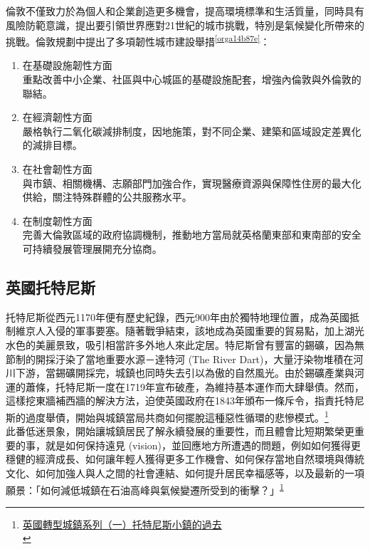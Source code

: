 \documentclass[a4paper,12pt]{article}
\begin{document}
倫敦不僅致力於為個人和企業創造更多機會，提高環境標準和生活質量，同時具有風險防範意識，提出要引領世界應對21世紀的城市挑戰，特別是氣候變化所帶來的挑戰。倫敦規劃中提出了多項韌性城市建設舉措\textsuperscript{\ref{orga14b87e}}：\\
\begin{enumerate}
\item 在基礎設施韌性方面\\
重點改善中小企業、社區與中心城區的基礎設施配套，增強內倫敦與外倫敦的聯結。\\
\item 在經濟韌性方面\\
嚴格執行二氧化碳減排制度，因地施策，對不同企業、建築和區域設定差異化的減排目標。\\
\item 在社會韌性方面\\
與市鎮、相關機構、志願部門加強合作，實現醫療資源與保障性住房的最大化供給，關注特殊群體的公共服務水平。\\
\item 在制度韌性方面\\
完善大倫敦區域的政府協調機制，推動地方當局就英格蘭東部和東南部的安全可持續發展管理展開充分協商。\\
\end{enumerate}

\subsection{英國托特尼斯}
\label{sec:org18556da}
托特尼斯從西元1170年便有歷史紀錄，西元900年由於獨特地理位置，成為英國抵制維京人入侵的軍事要塞。隨著戰爭結束，該地成為英國重要的貿易點，加上湖光水色的美麗景致，吸引相當許多外地人來此定居。特尼斯曾有豐富的錫礦，因為無節制的開採汙染了當地重要水源－達特河 (The River Dart)，大量汙染物堆積在河川下游，當錫礦開採完，城鎮也同時失去引以為傲的自然風光。由於錫礦產業與河運的蕭條，托特尼斯一度在1719年宣布破產，為維持基本運作而大肆舉債。然而，這樣挖東牆補西牆的解決方法，迫使英國政府在1843年頒布一條斥令，指責托特尼斯的過度舉債，開始與城鎮當局共商如何擺脫這種惡性循環的悲慘模式。\footnote{\href{https://lowestc.blogspot.com/2016/12/blog-post\_8.html}{英國轉型城鎮系列（一）托特尼斯小鎮的過去 }\\\label{orgf84e4fd}}\\

此番低迷景象，開始讓城鎮居民了解永續發展的重要性，而且體會比短期繁榮更重要的事，就是如何保持遠見 (vision)，並回應地方所遭遇的問題，例如如何獲得更穩健的經濟成長、如何讓年輕人獲得更多工作機會、如何保存當地自然環境與傳統文化、如何加強人與人之間的社會連結、如何提升居民幸福感等，以及最新的一項願景：「如何減低城鎮在石油高峰與氣候變遷所受到的衝擊？」\textsuperscript{\ref{orgf84e4fd}}\\
\end{document}

